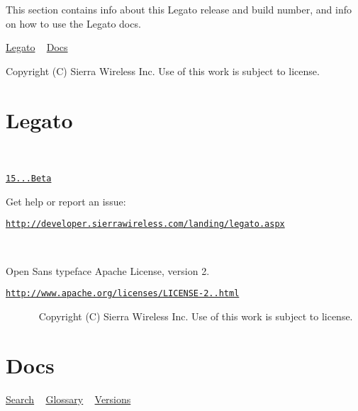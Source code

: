 This section contains info about this Legato release and build number, and info on how to use the Legato docs.

\hyperlink{aboutLegato}{Legato} ~\newline
 \hyperlink{aboutDocs}{Docs}





Copyright (C) Sierra Wireless Inc. Use of this work is subject to license. \hypertarget{aboutLegato}{}\section{Legato}\label{aboutLegato}
~\newline
 ~\newline
 ~\newline
 ~\newline
 \begin{center}\end{center} 

\begin{center}\href{#}{\tt 15...\+Beta} ~\newline
 ~\newline
\end{center} 

\begin{center}Get help or report an issue\+:\end{center} 

\begin{center}\href{http://developer.sierrawireless.com/landing/legato.aspx}{\tt http\+://developer.\+sierrawireless.\+com/landing/legato.\+aspx}\end{center} 

\begin{center}~\newline
 ~\newline
\end{center} 

\begin{center}Open Sans typeface Apache License, version 2.\end{center} 

\begin{center}\href{http://www.apache.org/licenses/LICENSE-2.0.html}{\tt http\+://www.\+apache.\+org/licenses/\+L\+I\+C\+E\+N\+S\+E-\/2..\+html}\end{center} 

\begin{center}~\newline
 ~\newline
 ~\newline
 ~\newline
 Copyright (C) Sierra Wireless Inc. Use of this work is subject to license.\end{center}  \hypertarget{aboutDocs}{}\section{Docs}\label{aboutDocs}
\hyperlink{aboutDocsSearch}{Search} ~\newline
 \hyperlink{aboutDocsGlossary}{Glossary} ~\newline
 \hyperlink{aboutDocsVersion}{Versions}

